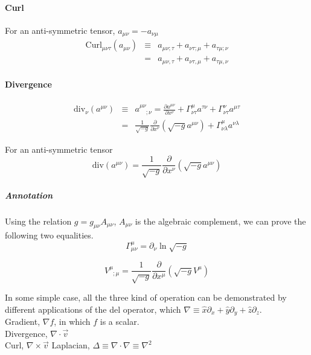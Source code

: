 \documentclass[11pt]{book}
\begin{document}
\paragraph{Curl}For an anti-symmetric tensor, $a_{\mu\nu}=-a_{\nu\mu}$
\begin{eqnarray}
\mathrm{Curl}_{\mu\nu\tau}(a_{\mu\nu})&\equiv& a_{\mu\nu;\tau}+a_{\nu\tau;\mu}+a_{\tau\mu;\nu} \\
&=&a_{\mu\nu,\tau}+a_{\nu\tau,\mu}+a_{\tau\mu,\nu}
\end{eqnarray}

\paragraph{Divergence}

\begin{eqnarray}
\mathrm{div}_\nu(a^{\mu\nu})&\equiv& a^{\mu\nu}_{\phantom{\mu\nu};\nu}=\frac{\partial a^{\mu\nu}}{\partial x^\nu}+\Gamma^\mu_{\nu\tau}a^{\tau\nu}+\Gamma^\nu_{\nu\tau}a^{\mu\tau} \\
&=&\frac1{\sqrt{-g}}\frac{\partial}{\partial x^\nu}(\sqrt{-g}a^{\mu\nu})+\Gamma^\mu_{\nu\lambda}a^{\nu\lambda}
\end{eqnarray}

For an anti-symmetric tensor
\begin{equation}
\mathrm {div}(a^{\mu\nu})=\frac1{\sqrt{-g}}\frac{\partial}{\partial x^\nu}(\sqrt{-g}a^{\mu\nu})
\end{equation}

\subparagraph{Annotation} Using the relation $g=g_{\mu\nu}A_{\mu\nu}$, $A_{\mu\nu}$ is the algebraic complement, we can prove the following two equalities.
\begin{equation}
\Gamma^\mu_{\mu\nu}=\partial_\nu\ln{\sqrt{-g}}
\end{equation}

\begin{equation}
V^\mu_{\phantom\mu;\mu}=\frac1{\sqrt{-g}}\frac{\partial}{\partial x^\mu}(\sqrt{-g}V^\mu)
\end{equation}

In some simple case, all the three kind of operation can be demonstrated by different applications of the del operator, which $\nabla\equiv \hat x\partial_x+\hat y\partial_y+\hat z \partial_z$. \\
Gradient,  $\nabla f$, in which $f$ is a scalar. \\
Divergence, $\nabla\cdot \vec v$ \\
Curl, $\nabla \times \vec v$
Laplacian, $\Delta\equiv \nabla\cdot\nabla\equiv \nabla^2$
\end{document}
